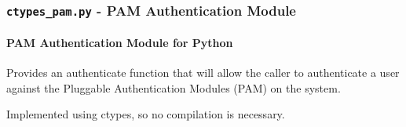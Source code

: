 \documentclass[letterpaper,10pt,openany]{sphinxmanual}
\begin{document}
\subsubsection{\texttt{ctypes\_pam.py} - PAM Authentication Module}
\label{Developer/ctypes_pam:ctypes-pam}\label{Developer/ctypes_pam::doc}\label{Developer/ctypes_pam:module-gateone.auth.ctypes_pam}\label{Developer/ctypes_pam:ctypes-pam-py-pam-authentication-module}

\paragraph{PAM Authentication Module for Python}
\label{Developer/ctypes_pam:gopam-py}\label{Developer/ctypes_pam:pam-authentication-module-for-python}
Provides an authenticate function that will allow the caller to authenticate
a user against the Pluggable Authentication Modules (PAM) on the system.

Implemented using ctypes, so no compilation is necessary.
\end{document}
